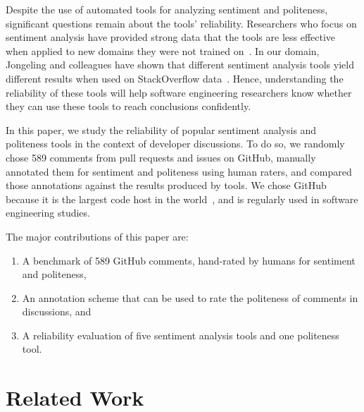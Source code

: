 Despite the use of automated tools for analyzing sentiment and 
politeness, significant questions remain about the tools' reliability.
Researchers who focus on sentiment analysis have provided strong data
that the tools are less effective when applied to new domains they 
were not trained on~\cite{novielli2015challenges,gamon2005pulse}. 
In our domain, Jongeling and colleagues have 
shown that different sentiment analysis tools yield different 
results when used on StackOverflow data~\cite{jongeling2017negative}. 
Hence, understanding the reliability of these tools will help 
software engineering researchers know whether they can use these
tools to reach conclusions confidently.

In this paper, we study the reliability of popular sentiment analysis 
and politeness tools in the context of developer discussions.
To do so, we randomly chose 589 comments from pull requests and issues on GitHub,
manually annotated them for sentiment and politeness using human raters,
and compared those annotations against the results produced by tools. 
We chose GitHub because it is the largest code host in 
the world~\cite{gousios2014lean}, and is regularly used in software 
engineering studies. 


The major contributions of this paper are:
\begin{enumerate}
    \item A benchmark of 589 GitHub comments, 
    hand-rated by humans for sentiment and politeness,  
    \item An annotation scheme that can be used to rate 
    the politeness of comments in discussions, and
    \item A reliability evaluation of five sentiment analysis 
    tools and one politeness tool.
\end{enumerate}




\section{Related Work}\label{relwork}
